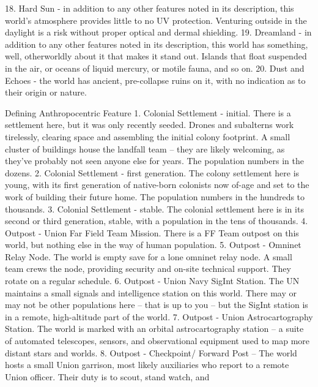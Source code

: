     18. Hard Sun - in addition to any other features noted in its description, this world’s
        atmosphere provides little to no UV protection. Venturing outside in the daylight is a risk
        without proper optical and dermal shielding.
    19. Dreamland - in addition to any other features noted in its description, this world has
        something, well, otherworldly about it that makes it stand out. Islands that float suspended
        in the air, or oceans of liquid mercury, or motile fauna, and so on.
    20. Dust and Echoes - the world has ancient, pre-collapse ruins on it, with no indication as to
        their origin or nature.

Defining Anthropocentric Feature
    1.  Colonial Settlement - initial. There is a settlement here, but it was only recently seeded.
        Drones and subalterns work tirelessly, clearing space and assembling the initial colony
        footprint. A small cluster of buildings house the landfall team -- they are likely welcoming,
        as they’ve probably not seen anyone else for years. The population numbers in the
        dozens.
    2.  Colonial Settlement - first generation. The colony settlement here is young, with its first
        generation of native-born colonists now of-age and set to the work of building their future
        home. The population numbers in the hundreds to thousands.
    3.  Colonial Settlement - stable. The colonial settlement here is in its second or third
        generation, stable, with a population in the tens of thousands.
    4.  Outpost - Union Far Field Team Mission. There is a FF Team outpost on this world, but
        nothing else in the way of human population.
    5.  Outpost - Omninet Relay Node. The world is empty save for a lone omninet relay node. A
        small team crews the node, providing security and on-site technical support. They rotate
        on a regular schedule.
    6.  Outpost - Union Navy SigInt Station. The UN maintains a small signals and intelligence
        station on this world. There may or may not be other populations here -- that is up to you --
        but the SigInt station is in a remote, high-altitude part of the world.
    7.  Outpost - Union Astrocartography Station. The world is marked with an orbital
        astrocartography station -- a suite of automated telescopes, sensors, and observational
        equipment used to map more distant stars and worlds.
    8.  Outpost - Checkpoint/ Forward Post -- The world hosts a small Union garrison, most likely
        auxiliaries who report to a remote Union officer. Their duty is to scout, stand watch, and
